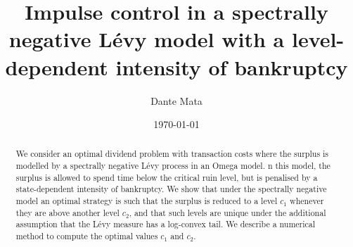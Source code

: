 \documentclass[11pt,reqno]{amsart}
\begin{document}
\title[Impulse control with a level-dependent intensity of ruin]{Impulse control in a spectrally negative L\'evy model with a level-dependent intensity of bankruptcy}

\author[D. Mata]{Dante Mata}


\address{D\'epartement de math\'ematiques, Universit\'e du Qu\'ebec \`a Montr\'eal (UQAM), 201 av.\ Pr\'esident-Kennedy, Montr\'eal (Qu\'ebec) H2X 3Y7, Canada}


\date{\today}


\begin{abstract}
We consider an optimal dividend problem with transaction costs where the surplus is modelled by a spectrally negative L\'evy process in an Omega model. n this model, the surplus is allowed to spend time below the critical ruin level, but is penalised by a state-dependent intensity of bankruptcy. We show that under the spectrally negative model an optimal strategy is such that the surplus is reduced to a level $c_1$ whenever they are above another level $c_2$, and that such levels are unique under the additional assumption that the L\'evy measure has a log-convex tail. We describe a numerical method to compute the optimal values $c_1$ and $c_2$.
\end{abstract}

\maketitle


\end{document}
